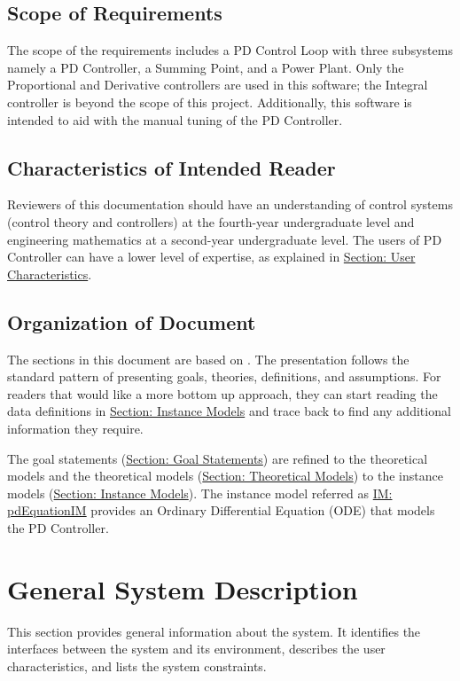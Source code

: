 \documentclass[12pt]{article}
\begin{document}
\subsection{Scope of Requirements}
\label{Sec:ReqsScope}
The scope of the requirements includes a PD Control Loop with three subsystems namely a PD Controller, a Summing Point, and a Power Plant. Only the Proportional and Derivative controllers are used in this software; the Integral controller is beyond the scope of this project. Additionally, this software is intended to aid with the manual tuning of the PD Controller.

\subsection{Characteristics of Intended Reader}
\label{Sec:ReaderChars}
Reviewers of this documentation should have an understanding of control systems (control theory and controllers) at the fourth-year undergraduate level and engineering mathematics at a second-year undergraduate level. The users of PD Controller can have a lower level of expertise, as explained in \hyperref[Sec:UserChars]{Section: User Characteristics}.

\subsection{Organization of Document}
\label{Sec:DocOrg}
The sections in this document are based on \cite{smithLai2005}. The presentation follows the standard pattern of presenting goals, theories, definitions, and assumptions. For readers that would like a more bottom up approach, they can start reading the data definitions in \hyperref[Sec:IMs]{Section: Instance Models} and trace back to find any additional information they require.

The goal statements (\hyperref[Sec:GoalStmt]{Section: Goal Statements}) are refined to the theoretical models and the theoretical models (\hyperref[Sec:TMs]{Section: Theoretical Models}) to the instance models (\hyperref[Sec:IMs]{Section: Instance Models}). The instance model referred as \hyperref[IM:pdEquationIM]{IM: pdEquationIM} provides an Ordinary Differential Equation (ODE) that models the PD Controller.

\section{General System Description}
\label{Sec:GenSysDesc}
This section provides general information about the system. It identifies the interfaces between the system and its environment, describes the user characteristics, and lists the system constraints.
\end{document}
